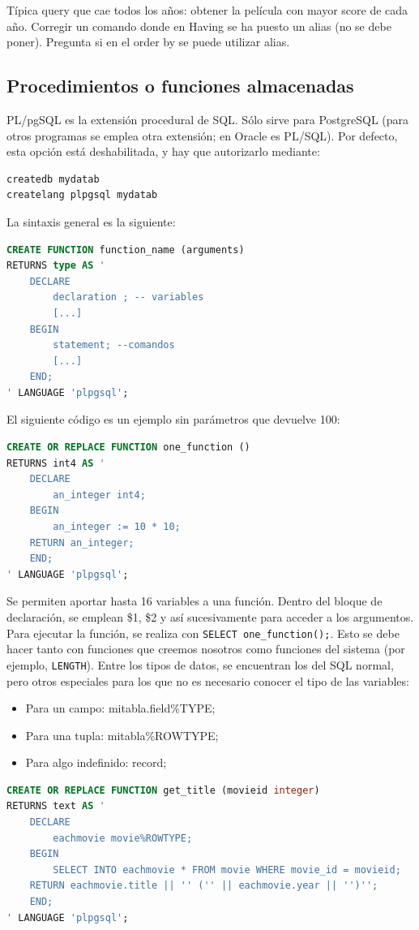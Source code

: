 Típica query que cae todos los años: obtener la película con mayor score de cada año. Corregir un comando donde en Having se ha puesto un alias (no se debe poner). Pregunta si en el order by se puede utilizar alias.

\subsection{Procedimientos o funciones almacenadas}
PL/pgSQL es la extensión procedural de SQL. Sólo sirve para PostgreSQL (para otros programas se emplea otra extensión; en Oracle es PL/SQL). Por defecto, esta opción está deshabilitada, y hay que autorizarlo mediante:
\begin{lstlisting}[language=SQL]
createdb mydatab
createlang plpgsql mydatab
\end{lstlisting}

La sintaxis general es la siguiente:
\begin{lstlisting}[language=SQL]
CREATE FUNCTION function_name (arguments)
RETURNS type AS '
	DECLARE
		declaration ; -- variables
		[...]
	BEGIN
		statement; --comandos
		[...]
	END;
' LANGUAGE 'plpgsql';
\end{lstlisting}

El siguiente código es un ejemplo sin parámetros que devuelve 100:
\begin{lstlisting}[language=SQL]
CREATE OR REPLACE FUNCTION one_function ()
RETURNS int4 AS '
	DECLARE
		an_integer int4;
	BEGIN
		an_integer := 10 * 10;
	RETURN an_integer;
	END;
' LANGUAGE 'plpgsql';
\end{lstlisting}

Se permiten aportar hasta 16 variables a una función. Dentro del bloque de declaración, se emplean \$1, \$2 y así sucesivamente para acceder a los argumentos. Para ejecutar la función, se realiza con \texttt{SELECT one\_function();}. Esto se debe hacer tanto con funciones que creemos nosotros como funciones del sistema (por ejemplo, \texttt{LENGTH}). Entre los tipos de datos, se encuentran los del SQL normal, pero otros especiales para los que no es necesario conocer el tipo de las variables:
\begin{itemize}
\item Para un campo: mitabla.field\%TYPE;
\item Para una tupla: mitabla\%ROWTYPE;
\item Para algo indefinido: record;
\end{itemize}

\begin{lstlisting}[language=SQL]
CREATE OR REPLACE FUNCTION get_title (movieid integer)
RETURNS text AS '
	DECLARE
		eachmovie movie%ROWTYPE;
	BEGIN
		SELECT INTO eachmovie * FROM movie WHERE movie_id = movieid;
	RETURN eachmovie.title || '' ('' || eachmovie.year || '')'';
	END;
' LANGUAGE 'plpgsql';
\end{lstlisting}

